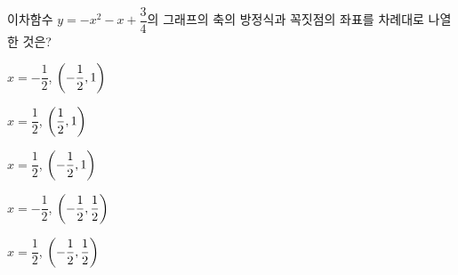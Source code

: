 이차함수 $y=-x^2-x+\dfrac{3}{4}$의 그래프의 축의 방정식과 꼭짓점의 좌표를 차례대로 나열한 것은?
\begin{choicesii}{\rule[-3ex]{0pt}{8ex}$x=-\dfrac{1}{2}$, $\left(-\dfrac{1}{2}{,}\mkern3mu 1\right)$}{\rule[-3ex]{0pt}{8ex}$x=\dfrac{1}{2}$, $\left(\dfrac{1}{2}{,}\mkern3mu 1\right)$}{\rule[-3ex]{0pt}{8ex}$x=\dfrac{1}{2}$, $\left(-\dfrac{1}{2}{,}\mkern3mu 1\right)$}{\rule[-3ex]{0pt}{8ex}$x=-\dfrac{1}{2}$, $\left(-\dfrac{1}{2}{,}\mkern3mu \dfrac{1}{2}\right)$}{\rule[-3ex]{0pt}{8ex}$x=\dfrac{1}{2}$, $\left(-\dfrac{1}{2}{,}\mkern3mu \dfrac{1}{2}\right)$}\end{choicesii}
